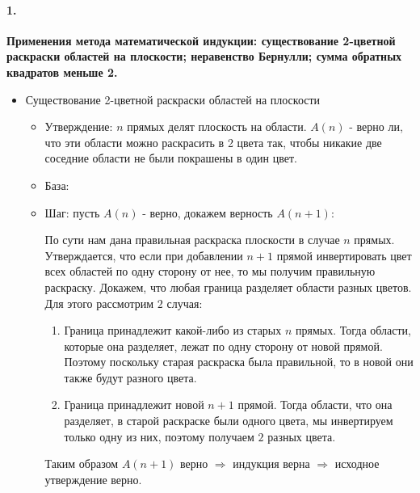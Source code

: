 \paragraph{1.}{
	\textbf{Применения метода математической индукции: существование 2-цветной раскраски областей на плоскости; неравенство Бернулли; сумма обратных квадратов меньше 2.}
	\begin{itemize}
		\item Существование 2-цветной раскраски областей на плоскости
		\begin{itemize}
			\item Утверждение: $n$ прямых делят плоскость на области. $A(n)$ - верно ли, что эти области можно раскрасить в 2 цвета так, чтобы никакие две соседние области не были покрашены в один цвет.
			\item База:
			\item Шаг: пусть $A(n)$ - верно, докажем верность $A(n + 1)$:
			
			По сути нам дана правильная раскраска плоскости в случае $n$ прямых. Утверждается, что если при добавлении $n+1$ прямой инвертировать цвет всех областей по одну сторону от нее, то мы получим правильную раскраску. Докажем, что любая граница разделяет области разных цветов. Для этого рассмотрим $2$ случая:
			\begin{enumerate}
				\item Граница принадлежит какой-либо из старых $n$ прямых. Тогда области, которые она разделяет, лежат по одну сторону от новой прямой. Поэтому поскольку старая раскраска была правильной, то в новой они также будут разного цвета.
				\item Граница принадлежит новой $n+1$ прямой. Тогда области, что она разделяет, в старой раскраске были одного цвета, мы инвертируем только одну из них, поэтому получаем $2$ разных цвета.
			\end{enumerate}
			
			Таким образом $A(n + 1)$ верно $\Rightarrow$ индукция верна $\Rightarrow$ исходное утверждение верно.
		\end{itemize}
		

\end{itemize}}
